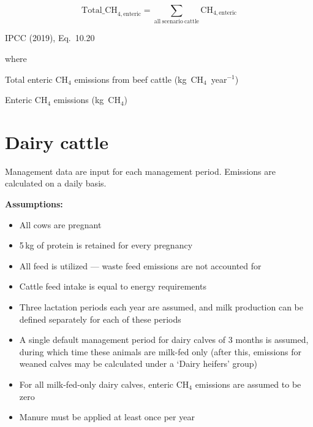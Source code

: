 \begin{equation}
    \mathrm{Total\_CH}_{4,\mathrm{enteric}} =
        \sum_{\mathrm{all\ scenario\ cattle}}
        \mathrm{CH}_{4,\mathrm{enteric}}
    \tag{Eq.\ 3.1.3.1}
\end{equation}

\noindent IPCC (2019), Eq.~10.20

\noindent where
\begin{description}[font=\normalfont, leftmargin=9em, style=sameline, nosep]
    \item[$\mathrm{Total\_CH}_{4,\mathrm{enteric}}$] Total enteric CH$_4$ emissions
          from beef cattle (kg~CH$_4$~year$^{-1}$)
    \item[$\mathrm{CH}_{4,\mathrm{enteric}}$] Enteric CH$_4$ emissions (kg~CH$_4$)
\end{description}

\section{Dairy cattle}
\label{sec:dairy}

Management data are input for each management period. Emissions are calculated
on a daily basis.

\noindent\textbf{Assumptions:}
\begin{itemize}[leftmargin=1.5em]
    \item All cows are pregnant
    \item 5\,kg of protein is retained for every pregnancy
    \item All feed is utilized --- waste feed emissions are not accounted for
    \item Cattle feed intake is equal to energy requirements
    \item Three lactation periods each year are assumed, and milk production can be
          defined separately for each of these periods
    \item A single default management period for dairy calves of 3 months is assumed,
          during which time these animals are milk-fed only (after this, emissions for
          weaned calves may be calculated under a `Dairy heifers' group)
    \item For all milk-fed-only dairy calves, enteric CH$_4$ emissions are assumed to
          be zero
    \item Manure must be applied at least once per year
\end{itemize}

